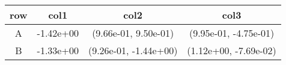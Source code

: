 \begin{tabular}{cccc}
\toprule
row&col1&col2&col3\tabularnewline
\midrule
A&-1.42e+00& (9.66e-01, 9.50e-01)& (9.95e-01, -4.75e-01)\tabularnewline
B&-1.33e+00& (9.26e-01, -1.44e+00)& (1.12e+00, -7.69e-02)\tabularnewline
\bottomrule
\end{tabular}
